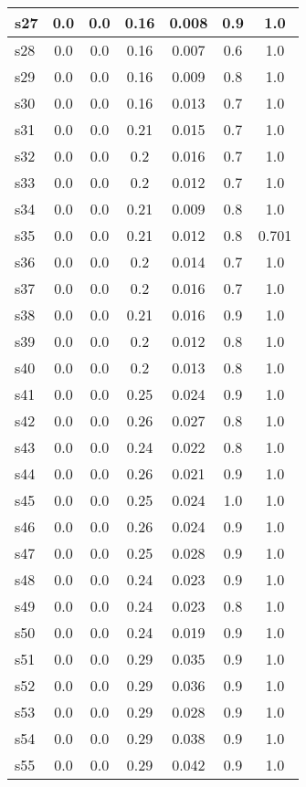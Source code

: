 \documentclass{article}
\begin{document}
\begin{tabular}{|l|c|c|c|c|c|c|}
\hline
s27 &0.0 & 0.0 & 0.16 & 0.008 & 0.9 & 1.0\\
\hline
s28 &0.0 & 0.0 & 0.16 & 0.007 & 0.6 & 1.0\\
\hline
s29 &0.0 & 0.0 & 0.16 & 0.009 & 0.8 & 1.0\\
\hline
s30 &0.0 & 0.0 & 0.16 & 0.013 & 0.7 & 1.0\\
\hline
s31 &0.0 & 0.0 & 0.21 & 0.015 & 0.7 & 1.0\\
\hline
s32 &0.0 & 0.0 & 0.2 & 0.016 & 0.7 & 1.0\\
\hline
s33 &0.0 & 0.0 & 0.2 & 0.012 & 0.7 & 1.0\\
\hline
s34 &0.0 & 0.0 & 0.21 & 0.009 & 0.8 & 1.0\\
\hline
s35 &0.0 & 0.0 & 0.21 & 0.012 & 0.8 & 0.701\\
\hline
s36 &0.0 & 0.0 & 0.2 & 0.014 & 0.7 & 1.0\\
\hline
s37 &0.0 & 0.0 & 0.2 & 0.016 & 0.7 & 1.0\\
\hline
s38 &0.0 & 0.0 & 0.21 & 0.016 & 0.9 & 1.0\\
\hline
s39 &0.0 & 0.0 & 0.2 & 0.012 & 0.8 & 1.0\\
\hline
s40 &0.0 & 0.0 & 0.2 & 0.013 & 0.8 & 1.0\\
\hline
s41 &0.0 & 0.0 & 0.25 & 0.024 & 0.9 & 1.0\\
\hline
s42 &0.0 & 0.0 & 0.26 & 0.027 & 0.8 & 1.0\\
\hline
s43 &0.0 & 0.0 & 0.24 & 0.022 & 0.8 & 1.0\\
\hline
s44 &0.0 & 0.0 & 0.26 & 0.021 & 0.9 & 1.0\\
\hline
s45 &0.0 & 0.0 & 0.25 & 0.024 & 1.0 & 1.0\\
\hline
s46 &0.0 & 0.0 & 0.26 & 0.024 & 0.9 & 1.0\\
\hline
s47 &0.0 & 0.0 & 0.25 & 0.028 & 0.9 & 1.0\\
\hline
s48 &0.0 & 0.0 & 0.24 & 0.023 & 0.9 & 1.0\\
\hline
s49 &0.0 & 0.0 & 0.24 & 0.023 & 0.8 & 1.0\\
\hline
s50 &0.0 & 0.0 & 0.24 & 0.019 & 0.9 & 1.0\\
\hline
s51 &0.0 & 0.0 & 0.29 & 0.035 & 0.9 & 1.0\\
\hline
s52 &0.0 & 0.0 & 0.29 & 0.036 & 0.9 & 1.0\\
\hline
s53 &0.0 & 0.0 & 0.29 & 0.028 & 0.9 & 1.0\\
\hline
s54 &0.0 & 0.0 & 0.29 & 0.038 & 0.9 & 1.0\\
\hline
s55 &0.0 & 0.0 & 0.29 & 0.042 & 0.9 & 1.0\\

\end{tabular}
\end{document}
